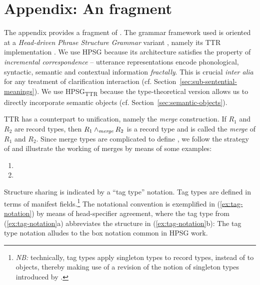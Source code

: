 \documentclass[output=paper
 	        ,biblatex
                ,babelshorthands
                ,newtxmath
                ,draftmode
                ,colorlinks, citecolor=brown
]{langscibook}
\begin{document}
\section*{Appendix: An \HPSGTTR fragment}

The appendix provides a fragment of \HPSGTTR.
%
The grammar framework used is oriented at a \textit{Head-driven Phrase Structure Grammar} variant \citep{Sag:Wasow:Bender:2003}, namely its TTR implementation \citep{Cooper:2008}.
%
We use HPSG because its  architecture satisfies the property of \emph{incremental correspondence} \citep{Johnson:Lappin:1999} -- utterance representations encode phonological, syntactic, semantic and contextual information \emph{fractally}.
%
 This is crucial {\it inter alia} for any treatment of clarification interaction (cf. Section~\ref{sec:sub-sentential-meanings}). 
%
We use HPSG\textsubscript{TTR} because the type-theoretical version allows us to directly incorporate semantic objects (cf. Section~\ref{sec:semantic-objects}).


TTR has a counterpart to unification, namely the \emph{merge} construction.
%
\ea
\ea If $R_1$ and $R_2$ are record types, then $R_1 \wedge_{\textit{merge}} R_2$ is a record type and is called the \emph{merge} of $R_1$ and $R_2$.
\ex Since merge types are complicated to define \citep[but see][]{Cooper:2012}, we follow the strategy of \citet{Cooper:2017:a} and illustrate the working of merges by means of some examples:
\begin{enumerate}[label=(\roman*), leftmargin=6.5em]
\item 
\avm{
[a & : T \\
b & : R]
\ttrmerge
[c & : S]
=
[a & : T \\
b & : R \\
c & : S]
}
\item 
\avm{
[a & : T ]
\ttrmerge
[a & : R]
=
[a & : T \ttrmerge\ R]
}
\end{enumerate}
\z
\z


Structure sharing is indicated by a \enquote{tag type} notation.
%
Tag types are defined in terms of manifest fields.\footnote{\textit{NB:} technically, tag types apply singleton types to record types, instead of to objects, thereby making use of a revision of the notion of singleton types introduced by \citet[4, footnote~3]{Cooper:2013}.}
%
The notational convention is exemplified in (\ref{ex:tag-notation}) by means of head-specifier agreement, where the tag type from (\ref{ex:tag-notation}a) abbreviates the structure in (\ref{ex:tag-notation}b):
%
\ea \label{ex:tag-notation}
\ea
{}
\ex 
{}
\z
\z 
%
The tag type notation alludes to the box notation common in HPSG work.
\end{document}
